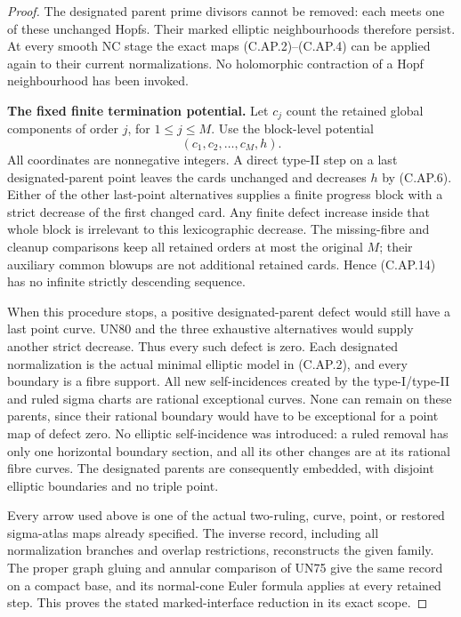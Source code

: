 \begin{proof}
The designated parent prime divisors cannot be removed:
each meets one of these unchanged Hopfs. Their marked
elliptic neighbourhoods therefore persist. At every smooth
NC stage the exact maps (C.AP.2)--(C.AP.4) can be applied
again to their current normalizations. No holomorphic
contraction of a Hopf neighbourhood has been invoked.

\par\medskip\noindent\textbf{The fixed finite termination potential.}
Let \(c_j\) count the retained global components of order
\(j\), for \(1\le j\le M\). Use the block-level potential
\[
                  (c_1,c_2,\ldots,c_M,h).
 \tag{C.AP.14}
\]
All coordinates are nonnegative integers. A direct type-II
step on a last designated-parent point leaves the cards
unchanged and decreases \(h\) by (C.AP.6). Either of the
other last-point alternatives supplies a finite progress
block with a strict decrease of the first changed card.
Any finite defect increase inside that whole block is
irrelevant to this lexicographic decrease. The missing-fibre
and cleanup comparisons keep all retained orders at most
the original \(M\); their auxiliary common blowups are not
additional retained cards. Hence (C.AP.14) has no infinite
strictly descending sequence.

When this procedure stops, a positive designated-parent
defect would still have a last point curve. UN80 and the
three exhaustive alternatives would supply another strict
decrease. Thus every such defect is zero. Each designated
normalization is the actual minimal elliptic model in
(C.AP.2), and every boundary is a fibre support. All new
self-incidences created by the type-I/type-II and ruled
sigma charts are rational exceptional curves. None can
remain on these parents, since their rational boundary
would have to be exceptional for a point map of defect
zero. No elliptic self-incidence was introduced: a ruled
removal has only one horizontal boundary section, and all
its other changes are at its rational fibre curves. The
designated parents are consequently embedded, with disjoint
elliptic boundaries and no triple point.

Every arrow used above is one of the actual two-ruling,
curve, point, or restored sigma-atlas maps already specified.
The inverse record, including all normalization branches
and overlap restrictions, reconstructs the given family.
The proper graph gluing and annular comparison of UN75
give the same record on a compact base, and its normal-cone
Euler formula applies at every retained step. This proves
the stated marked-interface reduction in its exact scope.
\end{proof}
